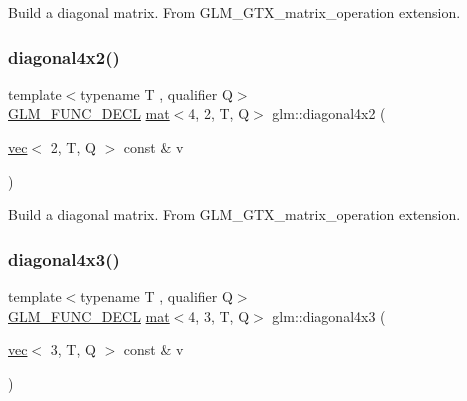 Build a diagonal matrix. From G\+L\+M\+\_\+\+G\+T\+X\+\_\+matrix\+\_\+operation extension. \mbox{\label{group__gtx__matrix__operation_gacb8969e6543ba775c6638161a37ac330}} 
\subsubsection{\texorpdfstring{diagonal4x2()}{diagonal4x2()}}
{\footnotesize\ttfamily template$<$typename T , qualifier Q$>$ \\
\hyperlink{setup_8hpp_ab2d052de21a70539923e9bcbf6e83a51}{G\+L\+M\+\_\+\+F\+U\+N\+C\+\_\+\+D\+E\+CL} \hyperlink{structglm_1_1mat}{mat}$<$4, 2, T, Q$>$ glm\+::diagonal4x2 (\begin{DoxyParamCaption}\item[{\hyperlink{structglm_1_1vec}{vec}$<$ 2, T, Q $>$ const \&}]{v }\end{DoxyParamCaption})}

Build a diagonal matrix. From G\+L\+M\+\_\+\+G\+T\+X\+\_\+matrix\+\_\+operation extension. \mbox{\label{group__gtx__matrix__operation_gae235def5049d6740f0028433f5e13f90}} 
\subsubsection{\texorpdfstring{diagonal4x3()}{diagonal4x3()}}
{\footnotesize\ttfamily template$<$typename T , qualifier Q$>$ \\
\hyperlink{setup_8hpp_ab2d052de21a70539923e9bcbf6e83a51}{G\+L\+M\+\_\+\+F\+U\+N\+C\+\_\+\+D\+E\+CL} \hyperlink{structglm_1_1mat}{mat}$<$4, 3, T, Q$>$ glm\+::diagonal4x3 (\begin{DoxyParamCaption}\item[{\hyperlink{structglm_1_1vec}{vec}$<$ 3, T, Q $>$ const \&}]{v }\end{DoxyParamCaption})}

